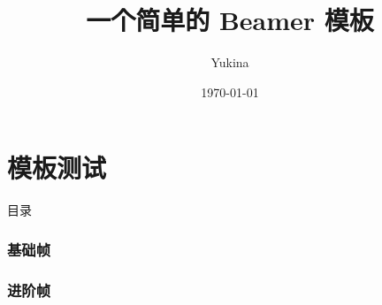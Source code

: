 \documentclass[aspectratio=169,10pt]{ctexbeamer}
\title[Beamer 模板测试]{\textbf{一个简单的 Beamer 模板}}
\author{Yukina}
\institute{Tianjin University of Commerce}
\date{\today}
\begin{document}
\frame{\titlepage}

\part{模板测试}

\begin{frame}{目录}
  \tableofcontents
\end{frame}

\section{基础帧}


\section{进阶帧}

\end{document}
